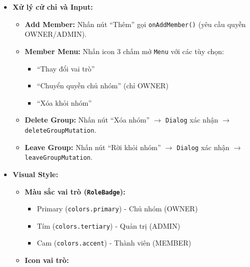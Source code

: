 \begin{itemize}
\begin{itemize}
\begin{itemize}
\begin{itemize}
                        \end{itemize}
                    \item \texttt{Actions}: Nút ``Xóa nhóm'' (Owner) hoặc ``Rời khỏi nhóm'' (Member).
                \end{itemize}
            \item \texttt{Portal.Dialog}: Dialog xác nhận xóa/rời nhóm.
        \end{itemize}
    \item \textbf{Xử lý cử chỉ và Input:}
        \begin{itemize}
            \item \textbf{Add Member:} Nhấn nút ``Thêm'' gọi \texttt{onAddMember()} (yêu cầu quyền OWNER/ADMIN).
            \item \textbf{Member Menu:} Nhấn icon 3 chấm mở \texttt{Menu} với các tùy chọn:
                \begin{itemize}
                    \item ``Thay đổi vai trò''
                    \item ``Chuyển quyền chủ nhóm'' (chỉ OWNER)
                    \item ``Xóa khỏi nhóm''
                \end{itemize}
            \item \textbf{Delete Group:} Nhấn nút ``Xóa nhóm'' $\rightarrow$ \texttt{Dialog} xác nhận $\rightarrow$ \texttt{deleteGroupMutation}.
            \item \textbf{Leave Group:} Nhấn nút ``Rời khỏi nhóm'' $\rightarrow$ \texttt{Dialog} xác nhận $\rightarrow$ \texttt{leaveGroupMutation}.
        \end{itemize}
    \item \textbf{Visual Style:}
        \begin{itemize}
            \item \textbf{Màu sắc vai trò (\texttt{RoleBadge}):}
                \begin{itemize}
                    \item Primary (\texttt{colors.primary}) - Chủ nhóm (OWNER)
                    \item Tím (\texttt{colors.tertiary}) - Quản trị (ADMIN)
                    \item Cam (\texttt{colors.accent}) - Thành viên (MEMBER)
                \end{itemize}
            \item \textbf{Icon vai trò:}
                \begin{itemize}

\end{itemize}
\end{itemize}
\end{itemize}
